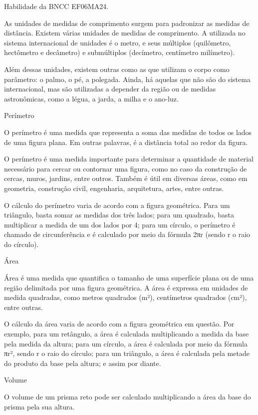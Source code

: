 Habilidade da BNCC EF06MA24.

As unidades de medidas de comprimento surgem para padronizar as medidas
de distância. Existem várias unidades de medidas de comprimento. A
utilizada no sistema internacional de unidades é o metro, e seus
múltiplos (quilômetro, hectômetro e decâmetro) e submúltiplos
(decímetro, centímetro milímetro).

Além dessas unidades, existem outras como as que utilizam o corpo como
parâmetro: o palmo, o pé, a polegada. Ainda, há aquelas que não são do
sistema internacional, mas são utilizadas a depender da região ou de
medidas astronômicas, como a légua, a jarda, a milha e o ano-luz.

Perímetro

O perímetro é uma medida que representa a soma das medidas de todos os
lados de uma figura plana. Em outras palavras, é a distância total ao
redor da figura.

O perímetro é uma medida importante para determinar a quantidade de
material necessário para cercar ou contornar uma figura, como no caso da
construção de cercas, muros, jardins, entre outros. Também é útil em
diversas áreas, como em geometria, construção civil, engenharia,
arquitetura, artes, entre outras.

O cálculo do perímetro varia de acordo com a figura geométrica. Para um
triângulo, basta somar as medidas dos três lados; para um quadrado,
basta multiplicar a medida de um dos lados por 4; para um círculo, o
perímetro é chamado de circunferência e é calculado por meio da fórmula
2πr (sendo r o raio do círculo).

Área

Área é uma medida que quantifica o tamanho de uma superfície plana ou de
uma região delimitada por uma figura geométrica. A área é expressa em
unidades de medida quadradas, como metros quadrados (m²), centímetros
quadrados (cm²), entre outras.

O cálculo da área varia de acordo com a figura geométrica em questão.
Por exemplo, para um retângulo, a área é calculada multiplicando a
medida da base pela medida da altura; para um círculo, a área é
calculada por meio da fórmula πr², sendo r o raio do círculo; para um
triângulo, a área é calculada pela metade do produto da base pela
altura; e assim por diante.

Volume

O volume de um prisma reto pode ser calculado multiplicando a área da
base do prisma pela sua altura.

